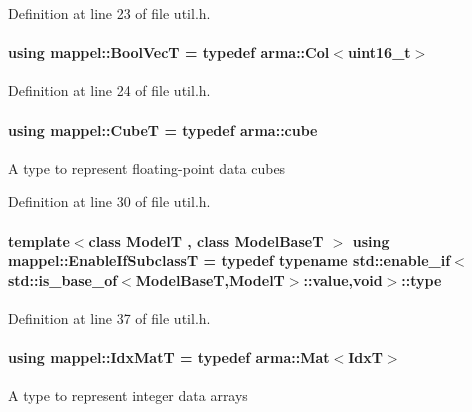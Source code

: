 Definition at line 23 of file util.\+h.

\paragraph[{\texorpdfstring{Bool\+VecT}{BoolVecT}}]{\setlength{\rightskip}{0pt plus 5cm}using {\bf mappel\+::\+Bool\+VecT} = typedef arma\+::\+Col$<$uint16\+\_\+t$>$}\hypertarget{namespacemappel_a167d761ecce3cafb6f98c00c16bdb523}{}\label{namespacemappel_a167d761ecce3cafb6f98c00c16bdb523}


Definition at line 24 of file util.\+h.

\paragraph[{\texorpdfstring{CubeT}{CubeT}}]{\setlength{\rightskip}{0pt plus 5cm}using {\bf mappel\+::\+CubeT} = typedef arma\+::cube}\hypertarget{namespacemappel_ab2afab4e6c8805e83946670d882768c2}{}\label{namespacemappel_ab2afab4e6c8805e83946670d882768c2}
A type to represent floating-\/point data cubes 

Definition at line 30 of file util.\+h.

\paragraph[{\texorpdfstring{Enable\+If\+SubclassT}{EnableIfSubclassT}}]{\setlength{\rightskip}{0pt plus 5cm}template$<$class ModelT , class Model\+BaseT $>$ using {\bf mappel\+::\+Enable\+If\+SubclassT} = typedef typename std\+::enable\+\_\+if$<$std\+::is\+\_\+base\+\_\+of$<$Model\+BaseT,ModelT$>$\+::value,void$>$\+::type}\hypertarget{namespacemappel_a5ee1448a35c267ee0bc4b8f1a2e09615}{}\label{namespacemappel_a5ee1448a35c267ee0bc4b8f1a2e09615}


Definition at line 37 of file util.\+h.

\paragraph[{\texorpdfstring{Idx\+MatT}{IdxMatT}}]{\setlength{\rightskip}{0pt plus 5cm}using {\bf mappel\+::\+Idx\+MatT} = typedef arma\+::\+Mat$<${\bf IdxT}$>$}\hypertarget{namespacemappel_a08989eafa9aeb1a4c3ec773614297d0d}{}\label{namespacemappel_a08989eafa9aeb1a4c3ec773614297d0d}
A type to represent integer data arrays 

